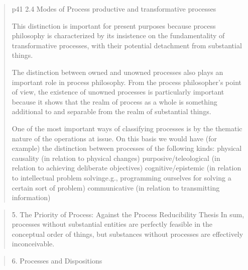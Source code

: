 \documentclass[a4paper]{Thesis}
\begin{document}
\begin{quotation}
	p41 2.4 Modes of Process
	productive and transformative processes
	
	This distinction is important for present purposes because process philosophy is
	characterized by its insistence on the fundamentality of transformative processes, with
	their potential detachment from substantial things.
	
	The distinction between owned and unowned processes also plays an important role in
	process philosophy.
	From the process philosopher's
	point of view, the existence of unowned processes is particularly important because it
	shows that the realm of process as a whole is something additional to and separable from
	the realm of substantial things.
	
	One of the most important ways of classifying processes is by the thematic nature of the
	operations at issue. On this basis we would have (for example) the distinction between
	processes of the following kinds:
	physical causality (in relation to physical changes)
	purposive/teleological (in relation to achieving deliberate objectives)
	cognitive/epistemic (in relation to intellectual problem solvinge.g.,
	programming ourselves for solving a certain sort of problem)
	communicative (in relation to transmitting information)
	
\end{quotation}

\begin{quotation}
	5. The Priority of Process: Against the Process Reducibility Thesis
	In sum, processes without substantial entities are perfectly feasible in the conceptual
	order of things, but substances without processes are effectively inconceivable.
\end{quotation}

\begin{quotation}
	6. Processes and Dispositions
	
\end{quotation}
\end{document}
